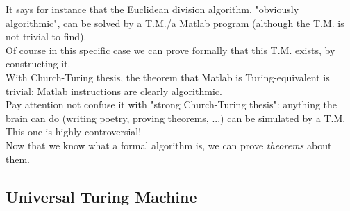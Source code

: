 It says for instance that the Euclidean division algorithm, "obviously algorithmic", can be solved by a T.M./a Matlab program (although the T.M. is not trivial to find).\\
Of course in this specific case we can prove formally that this T.M. exists, by constructing it.\\

With Church-Turing thesis, the theorem that Matlab is Turing-equivalent is trivial: Matlab instructions are clearly algorithmic.\\

Pay attention not confuse it with "strong Church-Turing thesis": anything the brain can do (writing poetry, proving theorems, ...) can be simulated by a T.M.\\
This one is highly controversial!\\

Now that we know what a formal algorithm is, we can prove \emph{theorems} about them.

\subsection{Universal Turing Machine}

